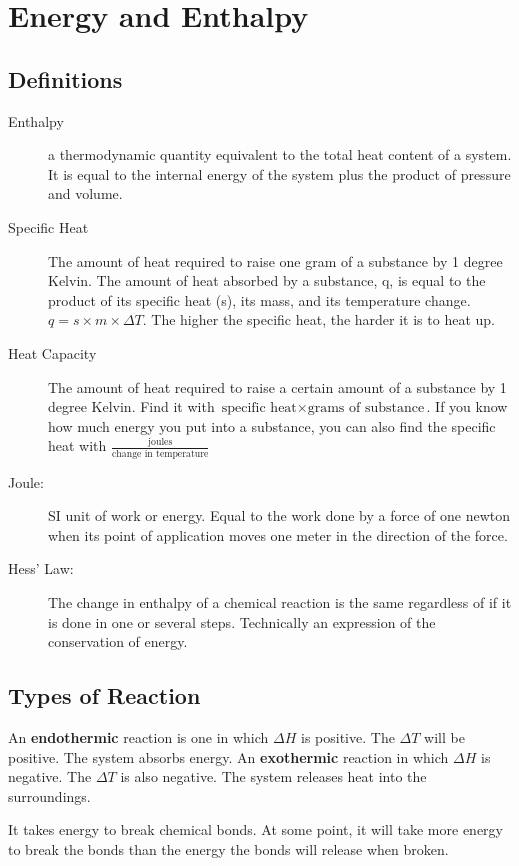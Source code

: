 \documentclass[]{article}
\begin{document}
\section{Energy and Enthalpy}
\subsection{Definitions}
\begin{description}
\item[Enthalpy] a thermodynamic quantity equivalent to the total heat content of a system. It is equal to the internal energy of the system plus the product of pressure and volume.

\item[Specific Heat] The amount of heat required to raise one gram of a substance by 1 degree Kelvin. 
The amount of heat absorbed by a substance, q, is equal to the product of its specific heat (s), its mass, and its temperature change. $ q = s \times m \times \Delta T $. The higher the specific heat, the harder it is to heat up.
\item[Heat Capacity] The amount of heat required to raise a certain amount of a substance by 1 degree Kelvin. Find it with $ \text{specific heat} \times \text{grams of substance} $. If you know how much energy you put into a substance, you can also find the specific heat with $ \frac{\text{joules}}{\text{change in temperature}} $
\item[Joule:] SI unit of work or energy. Equal to the work done by a force of one newton when its point of application moves one meter in the direction of the force.
\item[Hess' Law:] The change in enthalpy of a chemical reaction is the same regardless of if it is done in one or several steps. Technically an expression of the conservation of energy.
\end{description}
\subsection{Types of Reaction}
An \textbf{endothermic} reaction is one in which $ \Delta H $ is positive. The $ \Delta T $ will be positive. The system absorbs energy. An \textbf{exothermic} reaction in which $ \Delta H $ is negative. The $ \Delta T $ is also negative. The system releases heat into the surroundings.

It takes energy to break chemical bonds. At some point, it will take more energy to break the bonds than the energy the bonds will release when broken. 
\end{document}
